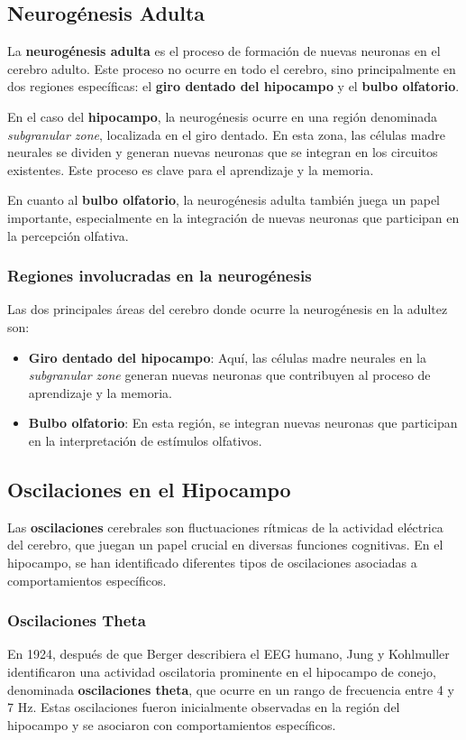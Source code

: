 \documentclass[12pt, letterpaper]{article}
\begin{document}
\subsection{Neurogénesis Adulta}
La \textbf{neurogénesis adulta} es el proceso de formación de nuevas neuronas en el cerebro adulto. Este proceso no ocurre en todo el cerebro, sino principalmente en dos regiones específicas: el \textbf{giro dentado del hipocampo} y el \textbf{bulbo olfatorio}.

En el caso del \textbf{hipocampo}, la neurogénesis ocurre en una región denominada \textit{subgranular zone}, localizada en el giro dentado. En esta zona, las células madre neurales se dividen y generan nuevas neuronas que se integran en los circuitos existentes. Este proceso es clave para el aprendizaje y la memoria.

En cuanto al \textbf{bulbo olfatorio}, la neurogénesis adulta también juega un papel importante, especialmente en la integración de nuevas neuronas que participan en la percepción olfativa.

\subsubsection{Regiones involucradas en la neurogénesis}
Las dos principales áreas del cerebro donde ocurre la neurogénesis en la adultez son:

\begin{itemize}
    \item \textbf{Giro dentado del hipocampo}: Aquí, las células madre neurales en la \textit{subgranular zone} generan nuevas neuronas que contribuyen al proceso de aprendizaje y la memoria.
    \item \textbf{Bulbo olfatorio}: En esta región, se integran nuevas neuronas que participan en la interpretación de estímulos olfativos.
\end{itemize}


\subsection{Oscilaciones en el Hipocampo}
Las \textbf{oscilaciones} cerebrales son fluctuaciones rítmicas de la actividad eléctrica del cerebro, que juegan un papel crucial en diversas funciones cognitivas. En el hipocampo, se han identificado diferentes tipos de oscilaciones asociadas a comportamientos específicos.

\subsubsection{Oscilaciones Theta}
En 1924, después de que Berger describiera el EEG humano, Jung y Kohlmuller identificaron una actividad oscilatoria prominente en el hipocampo de conejo, denominada \textbf{oscilaciones theta}, que ocurre en un rango de frecuencia entre 4 y 7 Hz. Estas oscilaciones fueron inicialmente observadas en la región del hipocampo y se asociaron con comportamientos específicos.
\end{document}

